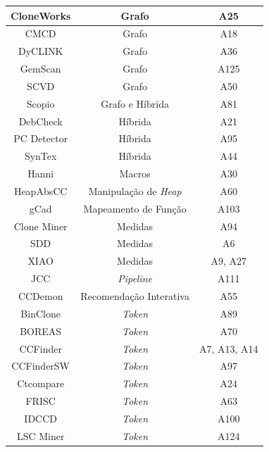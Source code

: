 \begin{table}[ht]
\begin{tabular}{@{}ccc@{}}
		CloneWorks    & Grafo                           & A25
		\\\hline
		CMCD          & Grafo                           & A18
		\\\hline
		DyCLINK       & Grafo                           & A36
		\\\hline
		GemScan       & Grafo                           & A125
		\\\hline
		SCVD          & Grafo                           & A50
		\\\hline
		Scopio        & Grafo e Híbrida                 & A81
		\\\hline
		DebCheck      & Híbrida                         & A21
		\\\hline
		PC Detector   & Híbrida                         & A95
		\\\hline
		SynTex        & Híbrida                         & A44
		\\\hline
		Hanni         & Macros                          & A30
		\\\hline
		HeapAbsCC     & Manipulação de \textit{Heap}    & A60
		\\\hline
		gCad          & Mapeamento de Função            & A103
		\\\hline
		Clone Miner   & Medidas                         & A94
		\\\hline
		SDD           & Medidas                         & A6
		\\\hline
		XIAO          & Medidas                         & A9, A27
		\\\hline
		JCC           & \textit{Pipeline}               & A111
		\\\hline
		CCDemon       & Recomendação Interativa         & A55
		\\\hline 
		BinClone      & \textit{Token}                  & A89
		\\\hline 
		BOREAS        & \textit{Token}                  & A70
		\\\hline 
		CCFinder      & \textit{Token}                  & A7, A13, A14
		\\\hline 
		CCFinderSW    & \textit{Token}                  & A97
		\\\hline
		Ctcompare     & \textit{Token}                  & A24
		\\\hline
		FRISC         & \textit{Token}                  & A63
		\\\hline
		IDCCD         & \textit{Token}                  & A100
		\\\hline
		LSC Miner     & \textit{Token}                  & A124

\end{tabular}
\end{table}
